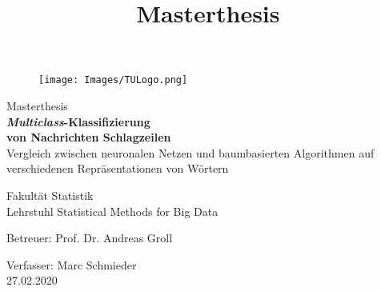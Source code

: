 \documentclass[a4paper,11pt]{article}
\begin{document}
\begin{titlepage}

\vspace*{3cm}


\begin{figure}[t]
\begin{flushright}
\texttt{[image: Images/TULogo.png]}


\end{flushright}
\end{figure}
\vspace*{3cm}


\begin{center}

\vspace*{2cm}

\title{Masterthesis}



{\huge Masterthesis}\\
 {\huge{\textbf{\textit{Multiclass}-Klassifizierung \\
 von Nachrichten Schlagzeilen}}\\}
 \vspace{0.2cm}
 {\large  Vergleich zwischen neuronalen Netzen und baumbasierten Algorithmen auf verschiedenen Repräsentationen von Wörtern\\}
\vspace*{4cm}


{\large  Fakultät Statistik\\
Lehrstuhl Statistical Methods for Big Data }
\vspace*{0.5cm}

 \begin{large}
 Betreuer: Prof. Dr. Andreas Groll\\
  \end{large}

  \begin{large}
Verfasser: Marc Schmieder\\
27.02.2020\\
   \vspace*{2cm}

 \end{large}
\end{center}

\thispagestyle{empty}
\tableofcontents
\newpage


\label{sec:abkuerz}
\vspace{1cm}


\end{titlepage}
\end{document}
